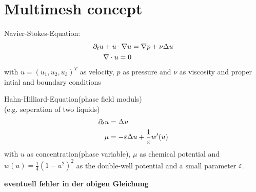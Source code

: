 \section{Multimesh concept}

\begin{example}
	Navier-Stokes-Equation:
	\begin{align*}
		\partial_t u + u \cdot \nabla u &= \nabla p + \nu \Delta u \\
		\nabla \cdot u = 0 
	\end{align*}
	with $u = (u_1,u_2,u_3)^T$ as velocity, $p$ as pressure and $\nu$ as viscosity and proper intial and boundary conditions
\end{example}

\begin{example}
	Hahn-Hilliard-Equation(phase field moduls)\\
	(e.g. seperation of two liquids)
	\begin{align*}
	\partial_t u &= \Delta u \\
	\mu &= -\varepsilon \Delta u + \frac{1}{\varepsilon}w'(u) 
	\end{align*}
	with $u$ as concentration(phase variable), $\mu$ as chemical potential and $w(u) = \frac{1}{4} (1-u^2)^2$ as the double-well potential and a small parameter $\varepsilon$.
\end{example}
\textbf{eventuell fehler in der obigen Gleichung}
